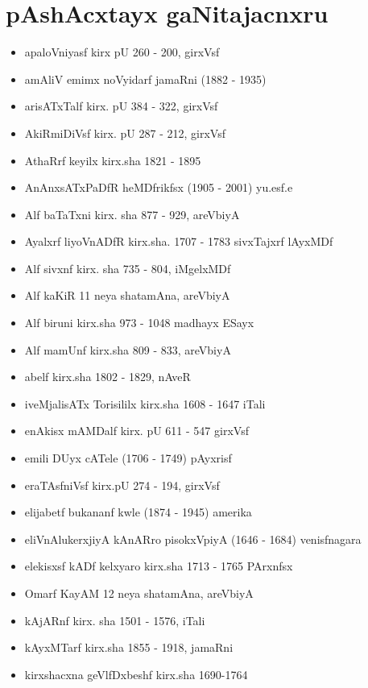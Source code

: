 \chapter{pAshAcxtayx gaNitajacnxru}

{\renewcommand\labelitemi{}
\begin{itemize}
\item apaloVniyasf kirx pU {\rm 260 - 200}, girxVsf
\item amAliV emimx noVyidarf jamaRni {\rm (1882 - 1935)}
\item arisATxTalf kirx. pU {\rm 384 - 322}, girxVsf
\item AkiRmiDiVsf kirx. pU {\rm 287 - 212}, girxVsf
\item AthaRrf keyilx kirx.sha {\rm 1821 - 1895}
\item AnAnxsATxPaDfR heMDfrikfsx {\rm (1905 - 2001)} yu.esf.e
\item Alf baTaTxni kirx. sha {\rm 877 - 929}, areVbiyA
\item Ayalxrf liyoVnADfR kirx.sha. {\rm 1707 - 1783} sivxTajxrf lAyxMDf
\item Alf sivxnf kirx. sha {\rm 735 - 804}, iMgelxMDf
\item Alf kaKiR {\rm 11} neya shatamAna, areVbiyA
\item Alf biruni kirx.sha {\rm 973 - 1048} madhayx ESayx
\item Alf mamUnf kirx.sha {\rm 809 - 833}, areVbiyA
\item abelf kirx.sha {\rm 1802 - 1829}, nAveR
\item iveMjalisATx Torisililx kirx.sha {\rm 1608 - 1647} iTali
\item enAkisx mAMDalf kirx. pU {\rm 611 - 547} girxVsf
\item emili DUyx cATele {\rm (1706 - 1749)} pAyxrisf
\item eraTAsfniVsf kirx.pU {\rm 274 - 194}, girxVsf
\item elijabetf bukananf kwle {\rm (1874 - 1945)} amerika
\item eliVnAlukerxjiyA kAnARro pisokxVpiyA {\rm (1646 - 1684)} venisfnagara
\item elekisxsf kADf kelxyaro kirx.sha {\rm 1713 - 1765} PArxnfsx
\item Omarf KayAM {\rm 12} neya shatamAna, areVbiyA
\item kAjARnf kirx. sha {\rm 1501 - 1576}, iTali
\item kAyxMTarf kirx.sha {\rm 1855 - 1918}, jamaRni
\item kirxshacxna geVlfDxbeshf kirx.sha {\rm 1690-1764}

\end{itemize}}
